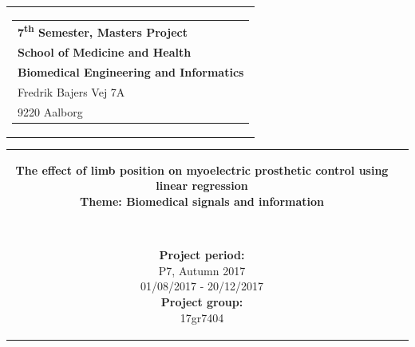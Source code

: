 % 
\thispagestyle{empty}
\begin{titlepage}
\begin{nopagebreak}
{\samepage 

\begin{tabular}{r}
\parbox{\textwidth}{  
\hfill \hspace{2cm} \parbox{8cm}{\begin{tabular}{l} %
{\small \textbf{\textcolor{aaublue}{{7\textsuperscript{th} Semester, Masters Project}}}}\\
{\small \textbf{\textcolor{aaublue}{School of Medicine and Health}}}\\
{\small \textbf{\textcolor{aaublue}{Biomedical Engineering and Informatics}}}\\
{\small \textcolor{aaublue}{Fredrik Bajers Vej 7A}} \\
{\small \textcolor{aaublue}{9220 Aalborg}} \\
\end{tabular}}}
\end{tabular}

\begin{tabular}{cc}
\parbox{7cm}{

\textbf{The effect of limb position on myoelectric prosthetic control using linear regression}
\\
\textbf{Theme: Biomedical signals and information}

\small{
\\
}


\parbox{8cm}{


\textbf{Project period:}\\
P7, Autumn 2017\\
01/08/2017 - 20/12/2017\\
   
\textbf{Project group:}\\
17gr7404\\ %
  
}}
\end{tabular}}
\end{nopagebreak}
\end{titlepage}
